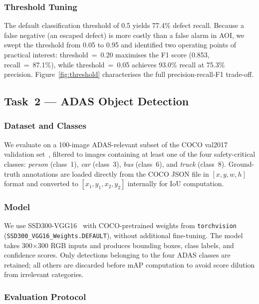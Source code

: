 \documentclass[conference]{IEEEtran}
\begin{document}
\subsubsection{Threshold Tuning}

The default classification threshold of 0.5 yields 77.4\% defect recall. Because a false negative (an escaped defect) is more costly than a false alarm in AOI, we swept the threshold from 0.05 to 0.95 and identified two operating points of practical interest: threshold~=~0.20 maximises the F1 score (0.853, recall~=~87.1\%), while threshold~=~0.05 achieves 93.0\% recall at 75.3\% precision. Figure~\ref{fig:threshold} characterises the full precision-recall-F1 trade-off.

\subsection{Task~2 --- ADAS Object Detection}

\subsubsection{Dataset and Classes}

We evaluate on a 100-image ADAS-relevant subset of the COCO val2017 validation set~\cite{lin2014coco}, filtered to images containing at least one of the four safety-critical classes: \emph{person} (class~1), \emph{car} (class~3), \emph{bus} (class~6), and \emph{truck} (class~8). Ground-truth annotations are loaded directly from the COCO JSON file in $[x, y, w, h]$ format and converted to $[x_1, y_1, x_2, y_2]$ internally for IoU computation.

\subsubsection{Model}

We use SSD300-VGG16~\cite{liu2016ssd} with COCO-pretrained weights from \texttt{torchvision} (\texttt{SSD300\_VGG16\_Weights.DEFAULT}), without additional fine-tuning. The model takes 300$\times$300 RGB inputs and produces bounding boxes, class labels, and confidence scores. Only detections belonging to the four ADAS classes are retained; all others are discarded before mAP computation to avoid score dilution from irrelevant categories.

\subsubsection{Evaluation Protocol}
\end{document}
